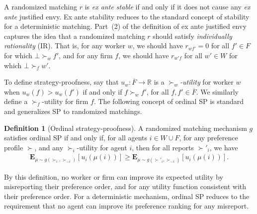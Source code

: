 \documentclass[11pt,letterpaper]{article}
\newtheorem{theorem}{Theorem}
\theoremstyle{definition}
\newtheorem{definition}[theorem]{Definition}
\newcommand{\kibitz}[2]{\ifnum\Comments=1{\color{#1}{#2}}\fi}
\newcommand{\zf}[1]{\kibitz{blue}{[ZF: #1]}}
\newcommand{\dcp}[1]{\kibitz{orange}{[DCP: #1]}}
\newcommand{\sdk}[1]{\kibitz{brass}{[SDK: #1]}}
\begin{document}

A randomized matching $r$ is {\em ex ante stable} if and only if it does not cause any {\em ex ante} justified envy. Ex ante stability reduces to the standard concept of stability for a deterministic matching. 
%
%
Part~(2) of the definition of ex ante justified envy captures
the idea that a randomized matching $r$ 
should satisfy \emph{individually rationality} (IR). 
%
That is, for  any worker $w$, we should have $r_{wf'} = 0$ for all $f'\in F$ for which $\bot \succ_w f'$, and for any firm $f$, we should have $r_{w'f}$ for all $w'\in W$ for which $\bot \succ_f w'$. %


To define  strategy-proofness, 
say that $u_w: \overline{F}\to \mathbb{R}$ is a {\em $\succ_w$-utility} for 
worker $w$ when  $u_w(f)>u_w(f')$ if and only if $f\succ_w f'$, for all $f, f'\in \overline{F}$. We similarly define a $\succ_f$-utility for firm $f$.
%
The following concept of ordinal SP is standard~\cite{Erdil14} %
and generalizes SP to randomized matchings.
%
\begin{definition}[Ordinal strategy-proofness]\label{def:ordinal-sp}
A randomized matching mechanism $g$ satisfies ordinal SP if and only if, for all agents  $i\in W\cup F$,  for any preference profile $\succ$, and any $\succ_i$-utility for agent $i$, 
then for all reports  $\succ'_i$, we have
\begin{align}
    \mathbf{E}_{\mu\sim g(\succ_i, \succ_{-i})}[u_i(\mu(i))] \geq \mathbf{E}_{\mu\sim g(\succ'_i, \succ_{-i})}[u_i(\mu(i))].
\end{align}
%
\end{definition}

By this definition, no worker or firm can improve its expected utility by misreporting their preference order, and for any   utility function consistent with their preference order.
%
For a deterministic mechanism,  ordinal SP reduces  to the  
requirement that no agent can improve its preference ranking for any misreport.
\end{document}
